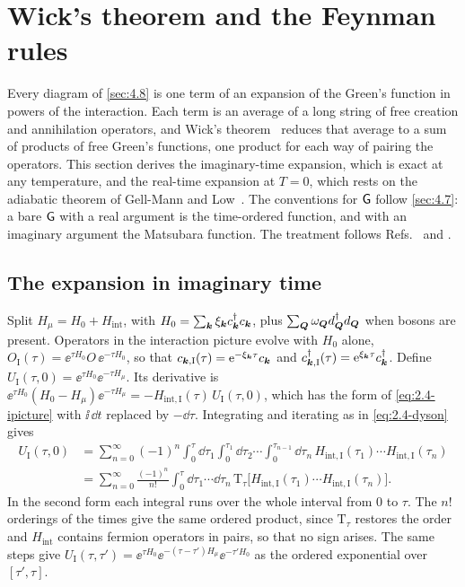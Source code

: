 \section{Wick's theorem and the Feynman rules}\label{app:D.11}

Every diagram of \cref{sec:4.8} is one term of an expansion of the Green's function in powers of the interaction. Each term is an average of a long string of free creation and annihilation operators, and Wick's theorem~\cite{wick1950evaluation} reduces that average to a sum of products of free Green's functions, one product for each way of pairing the operators. This section derives the imaginary-time expansion, which is exact at any temperature, and the real-time expansion at $T = 0$, which rests on the adiabatic theorem of Gell-Mann and Low~\cite{gellmann1951bound}. The conventions for $\mathsf{G}$ follow \cref{sec:4.7}: a bare $\mathsf{G}$ with a real argument is the time-ordered function, and with an imaginary argument the Matsubara function. The treatment follows Refs.~\cite[Chaps.~3 and 7]{fetter1971quantum} and \cite{bruus2004many}.

\subsection*{The expansion in imaginary time}

Split $H_\mu = H_0 + H_{\mathrm{int}}$, with $H_0 = \sum_{\bm{k}}\xi_{\bm{k}}c^\dagger_{\bm{k}}c_{\bm{k}}$, plus $\sum_{\bm{Q}}\omega_{\bm{Q}}d^\dagger_{\bm{Q}}d_{\bm{Q}}$ when bosons are present. Operators in the interaction picture evolve with $H_0$ alone, $O_{\mathrm{I}}(\tau) = \ee^{\tau H_0}O\,\ee^{-\tau H_0}$, so that $c_{\bm{k},\mathrm{I}}(\tau) = \mathrm{e}^{-\xi_{\bm{k}}\tau}c_{\bm{k}}$ and $c^\dagger_{\bm{k},\mathrm{I}}(\tau) = \mathrm{e}^{\xi_{\bm{k}}\tau}c^\dagger_{\bm{k}}$. Define $U_{\mathrm{I}}(\tau,0) = \ee^{\tau H_0}\ee^{-\tau H_\mu}$. Its derivative is $\ee^{\tau H_0}(H_0 - H_\mu)\ee^{-\tau H_\mu} = -H_{\mathrm{int},\mathrm{I}}(\tau)\,U_{\mathrm{I}}(\tau,0)$, which has the form of \cref{eq:2.4-ipicture} with $\ii\,\dd t$ replaced by $-\dd\tau$. Integrating and iterating as in \cref{eq:2.4-dyson} gives
\begin{equation*}
  \begin{aligned}
  U_{\mathrm{I}}(\tau,0) &= \sum_{n=0}^\infty(-1)^n\int_0^\tau\dd\tau_1\int_0^{\tau_1}\dd\tau_2\cdots\int_0^{\tau_{n-1}}\dd\tau_n\,H_{\mathrm{int},\mathrm{I}}(\tau_1)\cdots H_{\mathrm{int},\mathrm{I}}(\tau_n) \\
  &= \sum_{n=0}^\infty\frac{(-1)^n}{n!}\int_0^\tau\dd\tau_1\cdots\dd\tau_n\,\mathrm{T}_\tau\bigl[H_{\mathrm{int},\mathrm{I}}(\tau_1)\cdots H_{\mathrm{int},\mathrm{I}}(\tau_n)\bigr] .
  \end{aligned}
\end{equation*}
In the second form each integral runs over the whole interval from $0$ to $\tau$. The $n!$ orderings of the times give the same ordered product, since $\mathrm{T}_\tau$ restores the order and $H_{\mathrm{int}}$ contains fermion operators in pairs, so that no sign arises. The same steps give $U_{\mathrm{I}}(\tau,\tau') = \ee^{\tau H_0}\ee^{-(\tau - \tau')H_\mu}\ee^{-\tau'H_0}$ as the ordered exponential over $[\tau', \tau]$.

